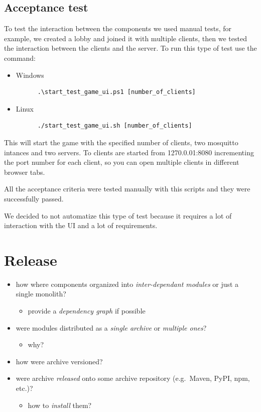 \documentclass{scrartcl}
\begin{document}
\subsection{Acceptance test}\label{acceptance-test}
To test the interaction between the components we used manual tests, for example, we created a lobby and joined it with multiple clients, then we tested the interaction between the clients and the server.
To run this type of test use the command:
\begin{itemize}
      \item Windows
      \begin{verbatim}
      .\start_test_game_ui.ps1 [number_of_clients]
      \end{verbatim}
      \item Linux
      \begin{verbatim}
      ./start_test_game_ui.sh [number_of_clients]
      \end{verbatim}
\end{itemize}
This will start the game with the specified number of clients, two mosquitto intances and two servers.
To clients are started from 1270.0.01:8080 incrementing the port number for each client, so you can open multiple clients in different browser tabs.


All the acceptance criteria were tested manually with this scripts and they were successfully passed.


We decided to not automatize this type of test because it requires a lot of interaction with the UI and a lot of requirements.

\section{Release}\label{release}

\begin{itemize}
      \item how where components organized into \emph{inter-dependant modules} or
            just a single monolith?

            \begin{itemize}
                  \item provide a \emph{dependency graph} if possible
            \end{itemize}
      \item were modules distributed as a \emph{single archive} or \emph{multiple
                  ones}?

            \begin{itemize}
                  \item why?
            \end{itemize}
      \item how were archive versioned?
      \item were archive \emph{released} onto some archive repository (e.g.~Maven,
            PyPI, npm, etc.)?

            \begin{itemize}
                  \item how to \emph{install} them?
            \end{itemize}
\end{itemize}
\end{document}
